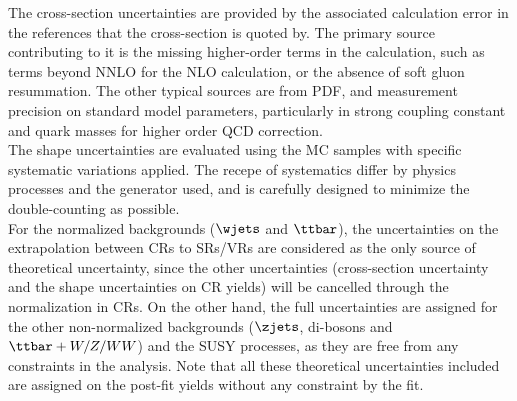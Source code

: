 The cross-section uncertainties are provided by the associated calculation error in the references that the cross-section is quoted by. The primary source contributing to it is the missing higher-order terms in the calculation, such as terms beyond NNLO for the NLO calculation, or the absence of soft gluon resummation. The other typical sources are from PDF, and measurement precision on standard model parameters, particularly in strong coupling constant and quark masses for higher order QCD correction.  \\
The shape uncertainties are evaluated using the MC samples with specific systematic variations applied. 
The recepe of systematics differ by physics processes and the generator used, and is carefully designed to minimize the double-counting as possible. \\

For the normalized backgrounds ($\wjets$ and $\ttbar$), the uncertainties on the extrapolation between CRs to SRs/VRs are considered as the only source of theoretical uncertainty, 
since the other uncertainties (cross-section uncertainty and the shape uncertainties on CR yields) will be cancelled through the normalization in CRs. 
On the other hand, the full uncertainties are assigned for the other non-normalized backgrounds ($\zjets$, di-bosons and $\ttbar+W/Z/WW$) and the SUSY processes, as they are free from any constraints in the analysis.
Note that all these theoretical uncertainties included are assigned on the post-fit yields without any constraint by the fit.


